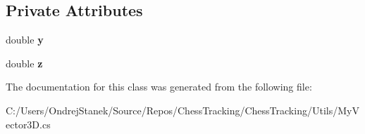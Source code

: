 \subsection*{Private Attributes}
\begin{DoxyCompactItemize}
\item 
\mbox{\label{class_chess_tracking_1_1_utils_1_1_my_vector3_d_a5f59292f4a061e6e3e0f55d6c776c246}} 
double {\bfseries y}
\item 
\mbox{\label{class_chess_tracking_1_1_utils_1_1_my_vector3_d_a7500656582ef9bfb81d91ac28e8e7fdb}} 
double {\bfseries z}
\end{DoxyCompactItemize}


The documentation for this class was generated from the following file\+:\begin{DoxyCompactItemize}
\item 
C\+:/\+Users/\+Ondrej\+Stanek/\+Source/\+Repos/\+Chess\+Tracking/\+Chess\+Tracking/\+Utils/My\+Vector3\+D.\+cs\end{DoxyCompactItemize}
